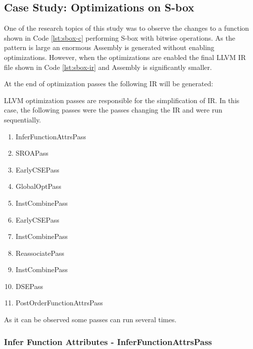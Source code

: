 \cite{passes}

\subsection{Case Study: Optimizations on S-box }\label{sbox-case}
One of the research topics of this study was to observe the changes to a function shown in Code \ref{lst:sbox-c} performing S-box with bitwise operations. As the pattern is large an enormous Assembly is generated without enabling optimizations. However, when the optimizations are enabled the final LLVM IR file shown in Code \ref{lst:sbox-ir} and Assembly is significantly smaller. 



At the end of optimization passes the following IR will be generated:
\begin{minipage}{0.95\linewidth}



\end{minipage}
LLVM optimization passes are responsible for the simplification of IR. In this case, the following passes were the passes changing the IR and were run sequentially.
\begin{enumerate}
    \item InferFunctionAttrsPass 
    \item SROAPass 
    \item EarlyCSEPass 
    \item GlobalOptPass 
    \item InstCombinePass 
    \item EarlyCSEPass 
    \item InstCombinePass 
    \item ReassociatePass 
    \item InstCombinePass 
    \item DSEPass 
    \item PostOrderFunctionAttrsPass 
\end{enumerate}
 As it can be observed some passes can run several times.


 \subsubsection{Infer Function Attributes - InferFunctionAttrsPass}\label{sec:funcAttrs}

